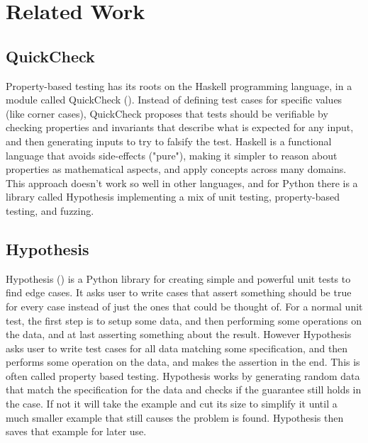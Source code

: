\documentclass[preprint,nocopyrightspace]{sig-alternate}
\begin{document}
\section{Related Work}

\subsection{QuickCheck}
Property-based testing has its roots on the Haskell programming language,
in a module called QuickCheck (\citet{claessen_quickcheck:_2011}).
Instead of defining test cases for specific values (like corner cases),
QuickCheck proposes that tests should be verifiable by checking properties and invariants that describe what is expected for any input,
and then generating inputs to try to falsify the test.
Haskell is a functional language that avoids side-effects ("pure"),
making it simpler to reason about properties as mathematical aspects,
and apply concepts across many domains.
This approach doesn't work so well in other languages,
and for Python there is a library called Hypothesis implementing a mix of unit testing,
property-based testing,
and fuzzing.

\subsection{Hypothesis}
Hypothesis (\citet{maciver_welcome_2015}) is a Python library for creating simple and powerful unit tests to find edge cases.
It asks user to write cases that assert something should be true for every case instead of just the ones that could be thought of.
For a normal unit test,
the first step is to setup some data,
and then performing some operations on the data,
and at last asserting something about the result.
However Hypothesis asks user to write test cases for all data matching some specification,
and then performs some operation on the data,
and makes the assertion in the end.
This is often called property based testing.
Hypothesis works by generating random data that match the specification for the data and checks if the guarantee still holds in the case.
If not it will take the example and cut its size to simplify it until a much smaller example that still causes the problem is found.
Hypothesis then saves that example for later use.
\end{document}
